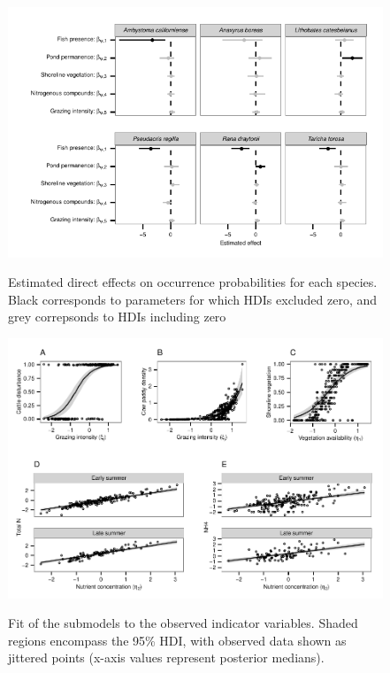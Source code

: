 \begin{figure}[htbp]
\caption[Direct effects on amphibian occurrence]{
Estimated direct effects on occurrence probabilities for each species.
Black corresponds to parameters for which HDIs excluded zero, and grey
correpsonds to HDIs including zero
}
\centering
\includegraphics[width=150mm]{figs/ch3/fig3.pdf}
\label{3-3}
\end{figure}

\begin{figure}[htbp]
\caption[Submodel fit for observed indicator variables]{
Fit of the submodels to the observed indicator variables. Shaded regions
encompass the 95\% HDI, with observed data shown as jittered points
(x-axis values represent posterior medians).
}
\centering
\includegraphics[width=150mm]{figs/ch3/fig4.pdf}
\label{3-4}
\end{figure}

